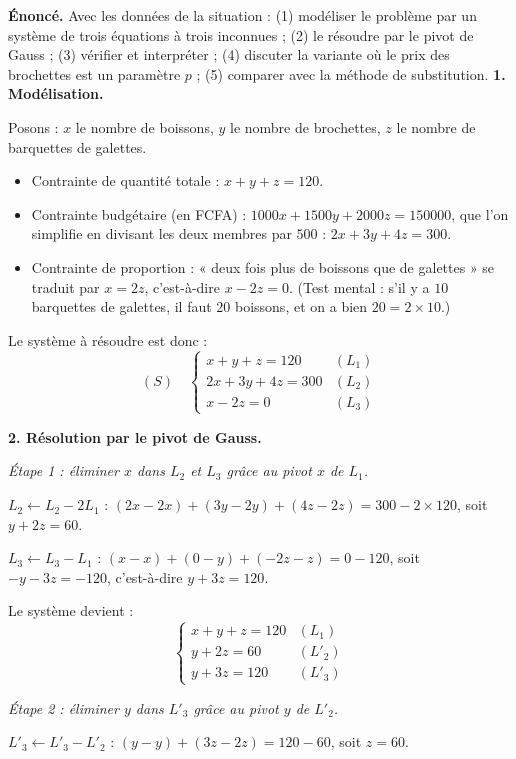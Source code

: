 \documentclass[11pt]{article}
\begin{document}
\begin{exoresolu}
\textbf{Énoncé.} Avec les données de la situation : (1) modéliser le problème par un système de trois équations à trois inconnues ; (2) le résoudre par le pivot de Gauss ; (3) vérifier et interpréter ; (4) discuter la variante où le prix des brochettes est un paramètre $p$ ; (5) comparer avec la méthode de substitution.
\tcblower
\textbf{1. Modélisation.}

Posons : $x$ le nombre de boissons, $y$ le nombre de brochettes, $z$ le nombre de barquettes de galettes.

\begin{itemize}
\item Contrainte de quantité totale : $x+y+z=120$.
\item Contrainte budgétaire (en FCFA) : $1000x+1500y+2000z=150000$, que l'on simplifie en divisant les deux membres par $500$ : $2x+3y+4z=300$.
\item Contrainte de proportion : « deux fois plus de boissons que de galettes » se traduit par $x=2z$, c'est-à-dire $x-2z=0$. (Test mental : s'il y a $10$ barquettes de galettes, il faut $20$ boissons, et on a bien $20=2\times 10$.)
\end{itemize}

Le système à résoudre est donc :
\[
(S)\quad\begin{cases} x+y+z=120 & (L_1)\\ 2x+3y+4z=300 & (L_2)\\ x-2z=0 & (L_3)\end{cases}
\]

\textbf{2. Résolution par le pivot de Gauss.}

\emph{Étape 1 : éliminer $x$ dans $L_2$ et $L_3$ grâce au pivot $x$ de $L_1$.}

$L_2 \leftarrow L_2-2L_1$ : $(2x-2x)+(3y-2y)+(4z-2z)=300-2\times 120$, soit $y+2z=60$.

$L_3 \leftarrow L_3-L_1$ : $(x-x)+(0-y)+(-2z-z)=0-120$, soit $-y-3z=-120$, c'est-à-dire $y+3z=120$.

Le système devient :
\[
\begin{cases} x+y+z=120 & (L_1)\\ y+2z=60 & (L'_2)\\ y+3z=120 & (L'_3)\end{cases}
\]

\emph{Étape 2 : éliminer $y$ dans $L'_3$ grâce au pivot $y$ de $L'_2$.}

$L'_3 \leftarrow L'_3-L'_2$ : $(y-y)+(3z-2z)=120-60$, soit $z=60$.


\end{exoresolu}
\end{document}
